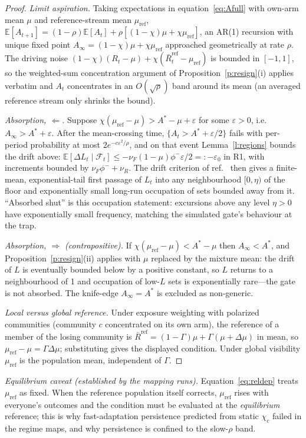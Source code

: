 \documentclass[11pt]{article}
\newcommand{\E}{\mathbb{E}}
\newcommand{\1}{\mathbf{1}}
\newcommand{\Astar}{A^{*}}
\begin{document}
\begin{proof}
\emph{Limit aspiration.} Taking expectations in equation~\eqref{eq:Afull} with own-arm
mean $\mu$ and reference-stream mean $\mu_{\mathrm{ref}}$,
$\E[A_{t+1}]=(1-\rho)\E[A_t]+\rho[(1-\chi)\mu+\chi\mu_{\mathrm{ref}}]$, an AR(1) recursion
with unique fixed point $A_\infty=(1-\chi)\mu+\chi\mu_{\mathrm{ref}}$ approached
geometrically at rate $\rho$. The driving noise $(1-\chi)(R_t-\mu)+\chi(\bar
R^{\mathrm{ref}}_t-\mu_{\mathrm{ref}})$ is bounded in $[-1,1]$, so the weighted-sum
concentration argument of Proposition~\ref{p:resign}(i) applies verbatim and $A_t$
concentrates in an $O(\sqrt\rho)$ band around its mean (an averaged reference stream only
shrinks the bound).

\emph{Absorption, $\Leftarrow$.} Suppose $\chi(\mu_{\mathrm{ref}}-\mu)>\Astar-\mu+\varepsilon$
for some $\varepsilon>0$, i.e.\ $A_\infty>\Astar+\varepsilon$. After the mean-crossing
time, $\{A_t>\Astar+\varepsilon/2\}$ fails with per-period probability at most
$2e^{-c\varepsilon^2/\rho}$, and on that event Lemma~\ref{l:regions} bounds the drift
above: $\E[\Delta L_t\mid\mathcal F_t]\le-\nu_F(1-\mu)\phi^-\varepsilon/2=:-\varepsilon_0$
in R1, with increments bounded by $\nu_F\phi^-+\nu_R$. The drift criterion of
ref.~ then gives a finite-mean, exponential-tail first passage of
$L_t$ into any neighbourhood $[0,\eta)$ of the floor and exponentially small long-run
occupation of sets bounded away from it. ``Absorbed shut'' is this occupation statement:
excursions above any level $\eta>0$ have exponentially small frequency, matching the
simulated gate's behaviour at the trap.

\emph{Absorption, $\Rightarrow$ (contrapositive).} If
$\chi(\mu_{\mathrm{ref}}-\mu)<\Astar-\mu$ then $A_\infty<\Astar$, and
Proposition~\ref{p:resign}(ii) applies with $\mu$ replaced by the mixture mean: the
drift of $L$ is eventually bounded below by a positive constant, so $L$ returns to a
neighbourhood of 1 and occupation of low-$L$ sets is exponentially rare---the gate is not
absorbed. The knife-edge $A_\infty=\Astar$ is excluded as non-generic.

\emph{Local versus global reference.} Under exposure weighting with polarized
communities (community $c$ concentrated on its own arm), the reference of a member of
the losing community is $\bar R^{\mathrm{ref}}=(1-\Gamma)\mu+\Gamma(\mu+\Delta\mu)$ in
mean, so $\mu_{\mathrm{ref}}-\mu=\Gamma\Delta\mu$; substituting gives the displayed
condition. Under global visibility $\mu_{\mathrm{ref}}$ is the population mean,
independent of $\Gamma$.
\end{proof}
\emph{Equilibrium caveat (established by the mapping runs).} Equation~\eqref{eq:reldep} treats $\mu_{\mathrm{ref}}$ as fixed. When the reference population itself corrects, $\mu_{\mathrm{ref}}$ rises with everyone's outcomes and the condition must be evaluated at the \emph{equilibrium} reference; this is why fast-adaptation persistence predicted from static $\chi_c$ failed in the regime maps, and why persistence is confined to the slow-$\rho$ band.
\end{document}
